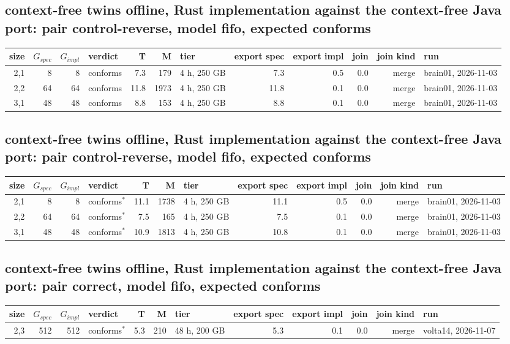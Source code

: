 \documentclass[10pt]{article}
\begin{document}
\subsection*{context-free twins offline, Rust implementation against the context-free Java port: pair \textsf{control-reverse}, model fifo, expected conforms}
\begin{longtable}{@{}rrrlrrlrrrrl@{}}
\toprule
size & $G_{\mathit{spec}}$ & $G_{\mathit{impl}}$ & verdict & T & M & tier & export spec & export impl & join & join kind & run \\
\midrule
\endhead
\color{blue} 2,1 & 8 & 8 & conforms & 7.3 & 179 & 4 h, 250 GB & 7.3 & 0.5 & 0.0 & merge & brain01, 2026-11-03 \\
\color{blue} 2,2 & 64 & 64 & conforms & 11.8 & 1973 & 4 h, 250 GB & 11.8 & 0.1 & 0.0 & merge & brain01, 2026-11-03 \\
\color{blue} 3,1 & 48 & 48 & conforms & 8.8 & 153 & 4 h, 250 GB & 8.8 & 0.1 & 0.0 & merge & brain01, 2026-11-03 \\
\bottomrule
\end{longtable}
\subsection*{context-free twins offline, Rust implementation against the context-free Java port: pair \textsf{control-reverse}, model fifo, expected conforms}
\begin{longtable}{@{}rrrlrrlrrrrl@{}}
\toprule
size & $G_{\mathit{spec}}$ & $G_{\mathit{impl}}$ & verdict & T & M & tier & export spec & export impl & join & join kind & run \\
\midrule
\endhead
\color{blue} 2,1 & 8 & 8 & conforms$^{\ast}$ & 11.1 & 1738 & 4 h, 250 GB & 11.1 & 0.5 & 0.0 & merge & brain01, 2026-11-03 \\
\color{blue} 2,2 & 64 & 64 & conforms$^{\ast}$ & 7.5 & 165 & 4 h, 250 GB & 7.5 & 0.1 & 0.0 & merge & brain01, 2026-11-03 \\
\color{blue} 3,1 & 48 & 48 & conforms$^{\ast}$ & 10.9 & 1813 & 4 h, 250 GB & 10.8 & 0.1 & 0.0 & merge & brain01, 2026-11-03 \\
\bottomrule
\end{longtable}
\subsection*{context-free twins offline, Rust implementation against the context-free Java port: pair \textsf{correct}, model fifo, expected conforms}
\begin{longtable}{@{}rrrlrrlrrrrl@{}}
\toprule
size & $G_{\mathit{spec}}$ & $G_{\mathit{impl}}$ & verdict & T & M & tier & export spec & export impl & join & join kind & run \\
\midrule
\endhead
\color{red} 2,3 & 512 & 512 & conforms$^{\ast}$ & 5.3 & 210 & 48 h, 200 GB & 5.3 & 0.1 & 0.0 & merge & volta14, 2026-11-07 \\
\bottomrule
\end{longtable}
\end{document}
